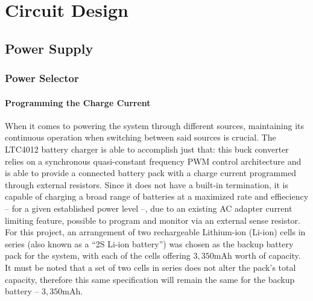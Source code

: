 


\section{Circuit Design}\label{sec:32_Circuit}


\subsection{Power Supply}\label{sec:321_POWERSUPPLY}

\subsubsection{Power Selector}\label{sec:3211_LTC4012}

\paragraph{Programming the Charge Current}	When it comes to powering the system through different sources, maintaining its continuous operation when switching between said sources is crucial. The LTC4012 battery charger is able to accomplish just that: this buck converter relies on a synchronous quasi-constant frequency \gls{PWM} control architecture and is able to provide a connected battery pack with a charge current programmed through external resistors. Since it does not have a built-in termination, it is capable of charging a broad range of batteries at a maximized rate and effieciency -- for a given established power level --, due to an existing \gls{AC} adapter current limiting feature, possible to program and monitor via an external sense resistor. For this project, an arrangement of two rechargeable Lithium-ion (Li-ion) cells in series (also known as a ``2S Li-ion battery'') was chosen as the backup battery pack for the system, with each of the cells offering $3,350$mAh worth of capacity. It must be noted that a set of two cells in series does not alter the pack's total capacity, therefore this same specification will remain the same for the backup battery -- $3,350$mAh.

